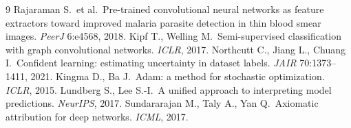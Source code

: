 
\begin{thebibliography}{9}
 Rajaraman S.\ et al.\ Pre-trained convolutional
neural networks as feature extractors toward improved malaria parasite
detection in thin blood smear images. \emph{PeerJ} 6:e4568, 2018.
 Kipf T., Welling M.\ Semi-supervised classification with
graph convolutional networks. \emph{ICLR}, 2017.
 Northcutt C., Jiang L., Chuang I.\ Confident
learning: estimating uncertainty in dataset labels. \emph{JAIR}
70:1373--1411, 2021.
 Kingma D., Ba J.\ Adam: a method for stochastic
optimization. \emph{ICLR}, 2015.
 Lundberg S., Lee S.-I.\ A unified approach to
interpreting model predictions. \emph{NeurIPS}, 2017.
 Sundararajan M., Taly A., Yan Q.\ Axiomatic
attribution for deep networks. \emph{ICML}, 2017.
\end{thebibliography}

